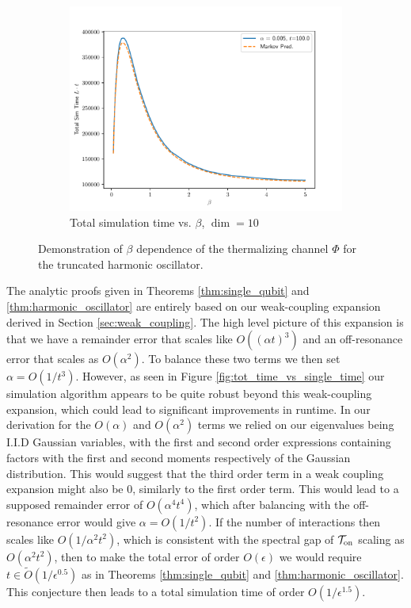 \documentclass{article}
\newcommand{\on}{\rm on}
\newcommand{\TT}{\mathcal{T}}
\newcommand{\bigo}[1]{O\left(#1\right)}
\newcommand{\bigotilde}[1]{\widetilde{O} \left( #1 \right)}
\begin{document}
\begin{figure}[t]
\begin{subfigure}{0.5\textwidth}
    \includegraphics[width=\textwidth]{numerics/data/sho_total_time_vs_beta_dim_10.pdf}
    \caption{Total simulation time vs. $\beta$, $\dim = 10$}
    \label{fig:sho_l_vs_beta_dim_10}
    \end{subfigure}
    \caption{Demonstration of $\beta$ dependence of the thermalizing channel $\Phi$ for the truncated harmonic oscillator.}
    \label{fig:sho_total_time_vs_beta}
\end{figure}

The analytic proofs given in Theorems \ref{thm:single_qubit} and \ref{thm:harmonic_oscillator} are entirely based on our weak-coupling expansion derived in Section \ref{sec:weak_coupling}. The high level picture of this expansion is that we have a remainder error that scales like $\bigo{(\alpha t)^3}$ and an off-resonance error that scales as $\bigo{\alpha^2}$. To balance these two terms we then set $\alpha = \bigo{1/t^3}$. However, as seen in Figure \ref{fig:tot_time_vs_single_time} our simulation algorithm appears to be quite robust beyond this weak-coupling expansion, which could lead to significant improvements in runtime. In our derivation for the $\bigo{\alpha}$ and $\bigo{\alpha^2}$ terms we relied on our eigenvalues being I.I.D Gaussian variables, with the first and second order expressions containing factors with the first and second moments respectively of the Gaussian distribution. This would suggest that the third order term in a weak coupling expansion might also be 0, similarly to the first order term. This would lead to a supposed remainder error of $\bigo{\alpha^4 t^4}$, which after balancing with the off-resonance error would give $\alpha = \bigo{1/t^2}$. If the number of interactions then scales like $\bigo{1/\alpha^2 t^2}$, which is consistent with the spectral gap of $\TT_{\on}$ scaling as $\bigo{\alpha^2 t^2}$, then to make the total error of order $\bigo{\epsilon}$ we would require $t \in \bigotilde{1/\epsilon^{0.5}}$ as in Theorems \ref{thm:single_qubit} and \ref{thm:harmonic_oscillator}. This conjecture then leads to a total simulation time of order $\bigo{1/\epsilon^{1.5}}$. 
\end{document}
